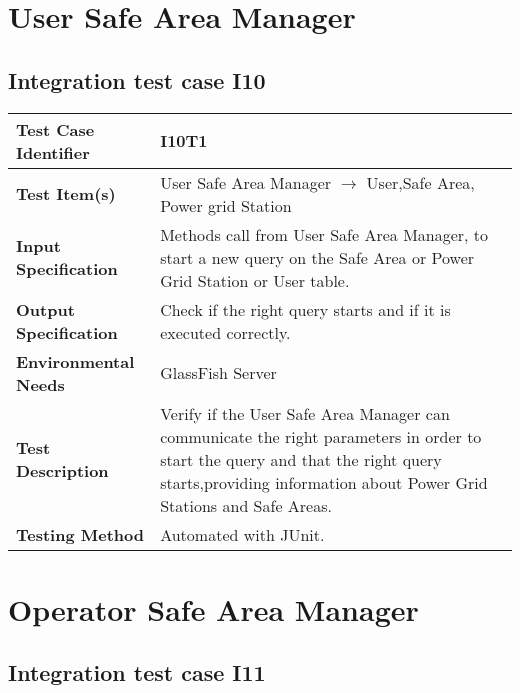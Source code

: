 \section{ User Safe Area Manager}
\subsection{Integration test case I10}

\begin{tabular}{l p{}}
    \hline
    \textbf{Test Case Identifier} & I10T1\\
    \hline
    \textbf{Test Item(s)} & User Safe Area Manager $\rightarrow$ User,Safe Area, Power grid Station\\
    \hline
    \textbf{Input Specification} & Methods call from User Safe Area Manager, to start a new query on the Safe Area or Power Grid Station or User table.\\
    \hline
    \textbf{Output Specification} & Check if the right query starts and if it is executed correctly.\\
    \hline
    \textbf{Environmental Needs} &  GlassFish Server\\
    \hline
    \textbf{Test Description} & Verify if the User Safe Area Manager can communicate the right parameters in order to start the query and that the right query starts,providing information about Power Grid Stations and Safe Areas.\\
    \hline
    \textbf{Testing Method} & Automated with JUnit.\\
    \hline
\end{tabular}

\section{ Operator Safe Area Manager}
\subsection{Integration test case I11}

